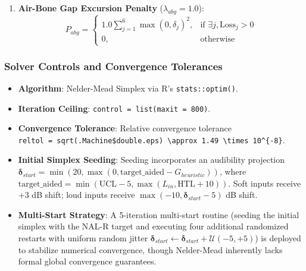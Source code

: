 \documentclass[
  12pt,
]{article}
\providecommand{\tightlist}{%
  \setlength{\itemsep}{0pt}\setlength{\parskip}{0pt}}
\begin{document}
\begin{enumerate}
  \(\Delta_{max, j} = 10.0 \cdot (1 - \text{ABG}_j / \max(0.001, \text{HTL}_j))\)
  for soft speech, bounding emergent compression ratios safely below
  3.0:1 for sensorineural loss while enforcing linear amplification for
  conductive components. This 3.0:1 ceiling represents the
  best-supported parameter in the algorithm, firmly grounded in
  empirical psychoacoustic literature (Souza, 2002; Souza et al., 2006)
  demonstrating severe envelope flattening, loss of acoustic contrast,
  and speech-in-noise deficits for CRs \(> 3.0:1\). Because this is
  enforced as a soft penalty (\(\lambda_{cr} = 200.0\)) rather than a
  hard algorithmic clamp, the solver can mathematically violate it when
  pushed against even stronger boundaries (e.g., yielding CRs \(> 3.0\)
  in profound losses like A4 or A5), effectively transitioning from wide
  dynamic range compression to hard limiting.
\item
  \textbf{Air-Bone Gap Excursion Penalty} (\(\lambda_{abg} = 1.0\)):
  \begin{equation}
  P_{abg} = \begin{cases} 
  1.0 \sum_{j=1}^6 \max(0, \delta_j)^2, & \text{if } \exists j, \text{Loss}_j > 0 \\ 
  0, & \text{otherwise} 
  \end{cases}
  \end{equation}
\end{enumerate}

\subsubsection{Solver Controls and Convergence
Tolerances}\label{solver-controls-and-convergence-tolerances}

\begin{itemize}
\tightlist
\item
  \textbf{Algorithm}: Nelder-Mead Simplex via R's
  \texttt{stats::optim()}.
\item
  \textbf{Iteration Ceiling}: \texttt{control\ =\ list(maxit\ =\ 800)}.
\item
  \textbf{Convergence Tolerance}: Relative convergence tolerance
  \texttt{reltol\ =\ sqrt(.Machine\$double.eps)\ \textbackslash{}approx\ 1.49\ \textbackslash{}times\ 10\^{}\{-8\}}.
\item
  \textbf{Initial Simplex Seeding}: Seeding incorporates an audibility
  projection
  \(\boldsymbol{\delta}_{start} = \min(20, \max(0, \text{target\_aided} - G_{heuristic}))\),
  where
  \(\text{target\_aided} = \min(\text{UCL} - 5, \max(L_{in}, \text{HTL} + 10))\).
  Soft inputs receive \(+3\) dB shift; loud inputs receive
  \(\max(-10, \boldsymbol{\delta}_{start} - 5)\) dB shift.
\item
  \textbf{Multi-Start Strategy}: A 5-iteration multi-start routine
  (seeding the initial simplex with the NAL-R target and executing four
  additional randomized restarts with uniform random jitter
  \(\boldsymbol{\delta}_{start} \leftarrow \boldsymbol{\delta}_{start} + \mathcal{U}(-5, +5)\))
  is deployed to stabilize numerical convergence, though Nelder-Mead
  inherently lacks formal global convergence guarantees.
\end{itemize}
\end{document}
